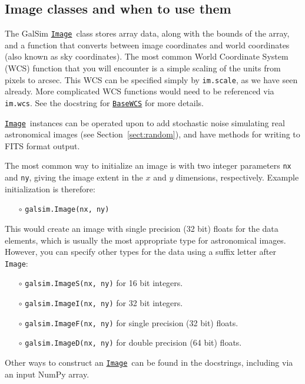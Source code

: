 \documentclass[preprint,10pt]{../../devel/modules/aastex}
\newcommand\Image{\href{http://galsim-developers.github.io/GalSim/classgalsim_1_1image_1_1_image.html}{\texttt{Image}}}
\begin{document}
\subsection{Image classes and when to use them}\label{sect:imageclasses}
The GalSim \Image\ class stores array data, along with the bounds
of the array, and a
function that converts between image coordinates and world coordinates
(also known as sky coordinates).  The most common World Coordinate System
(WCS) function that you will encounter is a simple scaling of the units
from pixels to arcsec.  This WCS can be specified simply by \texttt{im.scale},
as we have seen already.  More complicated WCS functions would need to
be referenced via \texttt{im.wcs}. 
See the docstring for \href{http://galsim-developers.github.io/GalSim/classgalsim_1_1wcs_1_1_base_w_c_s.html}{\texttt{BaseWCS}}
for more details.

\Image\ instances can be operated upon to add stochastic noise
simulating real astronomical images (see Section~\ref{sect:random}),
and have methods for writing to FITS format output.

The most common way to initialize an
image is with two integer parameters \texttt{nx} and \texttt{ny},
giving the image extent in the $x$ and $y$ dimensions, respectively.
Example initialization is therefore:
\begin{itemize}
  \item[$\circ$] \texttt{galsim.Image(nx, ny)}
\end{itemize}
This would create an image with single precision (32 bit) floats for the data elements, which
is usually the most appropriate type for astronomical images.  However, you can specify
other types for the data using a suffix letter after \texttt{Image}:
\begin{itemize}
  \item[$\circ$] \texttt{galsim.ImageS(nx, ny)} {for 16 bit integers.}

  \item[$\circ$] \texttt{galsim.ImageI(nx, ny)} {for 32 bit integers.}

  \item[$\circ$] \texttt{galsim.ImageF(nx, ny)} {for single precision (32 bit) floats.}

  \item[$\circ$] \texttt{galsim.ImageD(nx, ny)} {for double precision (64 bit) floats.}
\end{itemize}
Other ways to construct an \Image\ can be found in the
docstrings, including via an input NumPy array.
\end{document}
